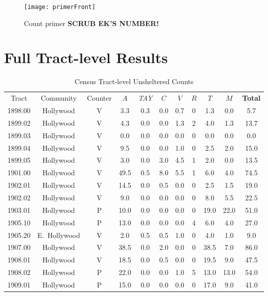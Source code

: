\documentclass[11pt,twocolumn]{article}
\def\bfr{\bf\color{red}}
\begin{document}
\begin{figure}
	\centering
	\texttt{[image: primerFront]}
	\caption{Count primer {\bfr SCRUB EK'S NUMBER!}}
\end{figure}

\section{Full Tract-level Results}

\begin{table}[]
\caption{Census Tract-level Unsheltered Counts}
\centering
\begin{tabular}{ccccccccccc}
\toprule
Tract & Community & Counter & $A$ & {\it TAY} & $C$ & $V$ & $R$ & $T$ & $M$ & {\bf Total} \\ \cmidrule{1-11}
1898.00 & Hollywood & V &  3.3 &  0.3 &  0.0 &  0.7 & 0 &  1.3 &  0.0 &   5.7 \\
1899.02 & Hollywood & V &  4.3 &  0.0 &  0.0 &  1.3 & 2 &  4.0 &  1.3 &  13.7 \\
1899.03 & Hollywood & V &  0.0 &  0.0 &  0.0 &  0.0 & 0 &  0.0 &  0.0 &   0.0 \\
1899.04 & Hollywood & V &  9.5 &  0.0 &  0.0 &  1.0 & 0 &  2.5 &  2.0 &  15.0 \\
1899.05 & Hollywood & V &  3.0 &  0.0 &  3.0 &  4.5 & 1 &  2.0 &  0.0 &  13.5 \\
1901.00 & Hollywood & V & 49.5 &  0.5 &  8.0 &  5.5 & 1 &  6.0 &  4.0 &  74.5 \\
1902.01 & Hollywood & V & 14.5 &  0.0 &  0.5 &  0.0 & 0 &  2.5 &  1.5 &  19.0 \\
1902.02 & Hollywood & V &  9.0 &  0.0 &  0.0 &  0.0 & 0 &  8.0 &  5.5 &  22.5 \\
1903.01 & Hollywood & P & 10.0 &  0.0 &  0.0 &  0.0 & 0 & 19.0 & 22.0 &  51.0 \\
1905.10 & Hollywood & P & 13.0 &  0.0 &  0.0 &  0.0 & 4 &  6.0 &  4.0 &  27.0 \\
1905.20 & E.~Hollywood & V &  2.0 &  0.5 &  0.5 &  1.0 & 0 &  4.0 &  1.0 &   9.0 \\
1907.00 & Hollywood & V & 38.5 &  0.0 &  2.0 &  0.0 & 0 & 38.5 &  7.0 &  86.0 \\
1908.01 & Hollywood & V & 18.5 &  0.0 &  0.5 &  0.0 & 0 & 19.5 &  9.0 &  47.5 \\
1908.02 & Hollywood & P & 22.0 &  0.0 &  0.0 &  1.0 & 5 & 13.0 & 13.0 &  54.0 \\
1909.01 & Hollywood & P & 15.0 &  0.0 &  0.0 &  0.0 & 0 & 17.0 &  9.0 &  41.0 \\

\end{tabular}
\end{table}
\end{document}
